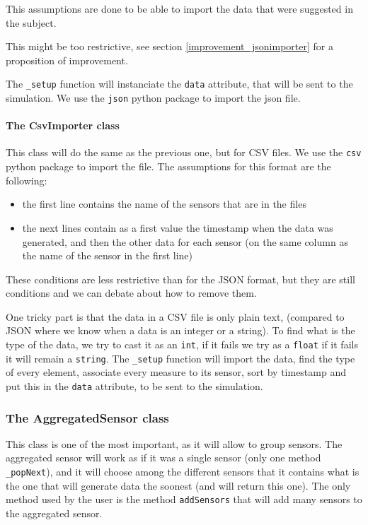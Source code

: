 This assumptions are done to be able to import the data that were suggested in
the subject.

This might be too restrictive, see section \ref{improvement_jsonimporter} for a
proposition of improvement.

The \verb!_setup! function will instanciate the \verb!data! attribute, that
will be sent to the simulation. We use the \verb!json! python package to import
the json file.

\paragraph{The CsvImporter class}

This class will do the same as the previous one, but for CSV files. We use the
\verb!csv! python package to import the file. The assumptions for this format
are the following:
\begin{itemize}
\item the first line contains the name of the sensors that are in the files
\item the next lines contain as a first value the timestamp when the data was
generated, and then the other data for each sensor (on the same column as the
name of the sensor in the first line)
\end{itemize}

These conditions are less restrictive than for the JSON format, but they are
still conditions and we can debate about how to remove them.

One tricky part is that the data in a CSV file is only plain text, (compared
to JSON where we know when a data is an integer or a string). To find what
is the type of the data, we try to cast it as an \verb!int!, if it fails
we try as a \verb!float! if it fails it will remain a \verb!string!. The
\verb!_setup! function will import the data, find the type of every element,
associate every measure to its sensor, sort by timestamp and put this in the
\verb!data! attribute, to be sent to the simulation.

\subsubsection{The AggregatedSensor class}

This class is one of the most important, as it will allow to group
sensors. The aggregated sensor will work as if it was a single sensor (only one
method \verb!_popNext!), and it will choose among the different sensors
that it contains what is the one that will generate data the soonest
(and will return this one). The only method used by the user is the method
\verb!addSensors! that will add many sensors to the aggregated sensor.

